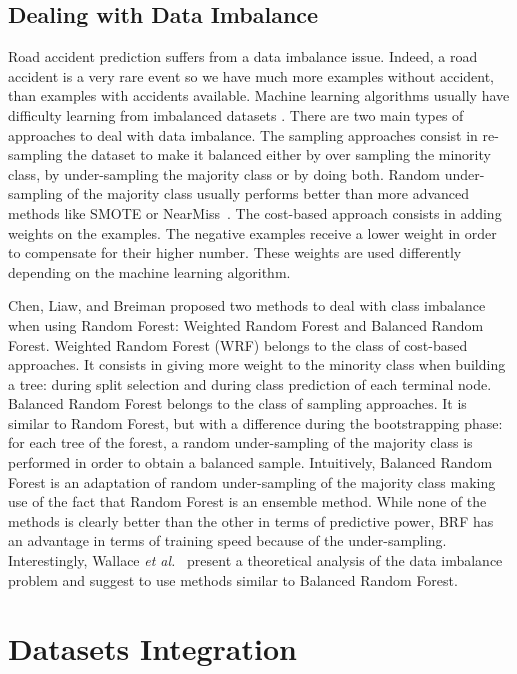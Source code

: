 \documentclass[conference]{IEEEtran}
\begin{document}
\subsection{Dealing with Data Imbalance}

Road accident prediction suffers from a data imbalance issue. Indeed, a road
accident is a very rare event so we have much more examples without accident, than examples with accidents available. Machine learning algorithms usually
have difficulty learning from imbalanced datasets \cite{Branco2016}.
There are two main types of approaches to deal with data imbalance. The sampling approaches consist in re-sampling the dataset to make it balanced either by over sampling the
minority class, by under-sampling the majority class or by doing both.
Random under-sampling of the majority class usually performs better than
more advanced methods like SMOTE or NearMiss~\cite{Branco2016}.
The cost-based approach consists in adding weights on the examples. The
negative examples receive a lower weight in order to compensate for their
higher number. These weights are used differently depending on the machine
learning algorithm. 

Chen, Liaw, and Breiman\cite{Chen2004} proposed two methods to deal with class imbalance
when using Random Forest: Weighted Random Forest and Balanced Random Forest.
Weighted Random Forest (WRF) belongs to the class of cost-based approaches. It consists in giving more weight to the minority class when building a tree: during split selection and during 
class prediction of each terminal node. Balanced Random Forest belongs to the class of sampling
approaches. It is similar to Random Forest, but with a
difference during the bootstrapping phase: for each tree of the forest, a random under-sampling of the
majority class is performed in order to obtain a balanced sample. Intuitively,
Balanced Random Forest is an adaptation of random under-sampling of the majority
class making use of the fact that Random Forest is an ensemble method.
While none of the methods is clearly better than the other in terms of predictive
power, BRF has an advantage in terms of training speed because of the under-sampling. Interestingly, Wallace \textit{et al.}~\cite{Wallace2011} present a theoretical analysis of the data
imbalance problem and suggest to use methods similar to Balanced Random Forest.


\section{Datasets Integration}
\label{sec:datasetsintegration}
\end{document}
